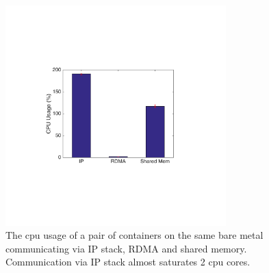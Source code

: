 
\begin{figure}[!ht]
     \centering 
     \includegraphics[width=3.35in]{figures/motivation/eval_baremetal_cpu.pdf} 
     \caption{\label{fig:eval_baremetal_cpu} The cpu usage of a pair of containers on the same bare metal communicating via IP stack, RDMA and shared memory. Communication via IP stack almost saturates 2 cpu cores.} 
\end{figure} 

\fi
